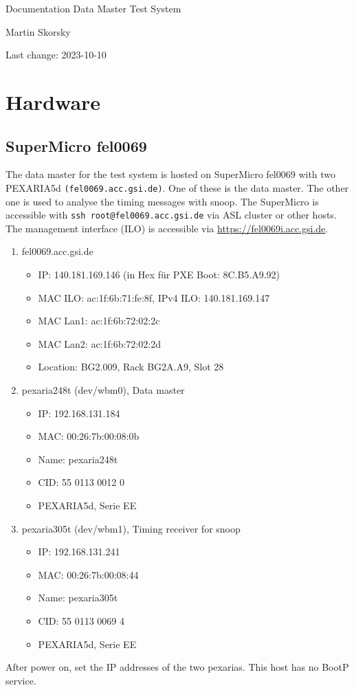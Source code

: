 \documentclass[12pt,a4paper]{report}
\begin{document}
\begin{titlepage}
\vspace{2cm}
\begin{center}
\Huge{Documentation Data Master Test System}

\Large{Martin Skorsky}

\Large{Last change: 2023-10-10}
\end{center}
\vfill
\end{titlepage}

\tableofcontents

\chapter{Hardware}
\section{SuperMicro fel0069}
The data master for the test system is hosted on SuperMicro fel0069 with two PEXARIA5d \texttt{(fel0069.acc.gsi.de)}.
One of these is the data master. The other one is used to analyse the timing messages with snoop.
The SuperMicro is accessible with \texttt{ssh root@fel0069.acc.gsi.de} via ASL cluster or other hosts.
The management interface (ILO) is accessible via \url{https://fel0069i.acc.gsi.de}.
\begin{enumerate}
\item fel0069.acc.gsi.de
\begin{itemize}
\item IP: 140.181.169.146 (in Hex für PXE Boot: 8C.B5.A9.92)
\item MAC ILO: ac:1f:6b:71:fe:8f, IPv4 ILO: 140.181.169.147
\item MAC Lan1: ac:1f:6b:72:02:2c
\item MAC Lan2: ac:1f:6b:72:02:2d
\item Location: BG2.009, Rack BG2A.A9, Slot 28
\end{itemize}
\item pexaria248t (dev/wbm0), Data master
\begin{itemize}
\item IP: 192.168.131.184
\item MAC: 00:26:7b:00:08:0b
\item Name: pexaria248t
\item CID: 55 0113 0012 0
\item PEXARIA5d, Serie EE
\end{itemize}
\item pexaria305t (dev/wbm1), Timing receiver for snoop
\begin{itemize}
\item IP: 192.168.131.241
\item MAC: 00:26:7b:00:08:44
\item Name: pexaria305t
\item CID: 55 0113 0069 4
\item PEXARIA5d, Serie EE
\end{itemize}
\end{enumerate}
After power on, set the IP addresses of the two pexarias. This host has no BootP service.
\end{document}
